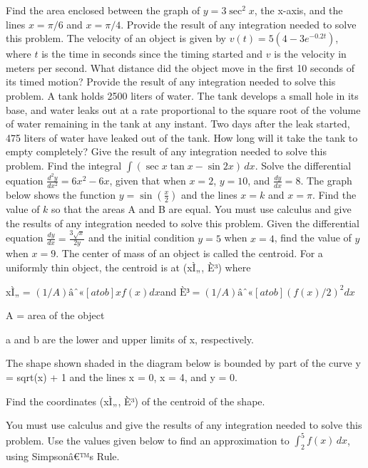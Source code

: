 \documentclass[12pt,addpoints]{exam}
\begin{document}
\begin{questions}
\fillwithlines{3cm}
\question[5] Find the area enclosed between the graph of \(y = 3 \sec^2 x\), the x-axis, and the lines \(x = \pi/6\) and \(x = \pi/4\). Provide the result of any integration needed to solve this problem.
\fillwithlines{3cm}
\question[5] The velocity of an object is given by \(v(t) = 5(4 - 3e^{-0.2t})\), where \(t\) is the time in seconds since the timing started and \(v\) is the velocity in meters per second. What distance did the object move in the first 10 seconds of its timed motion? Provide the result of any integration needed to solve this problem.
\fillwithlines{3cm}
\question[5] A tank holds 2500 liters of water. The tank develops a small hole in its base, and water leaks out at a rate proportional to the square root of the volume of water remaining in the tank at any instant. Two days after the leak started, 475 liters of water have leaked out of the tank. How long will it take the tank to empty completely? Give the result of any integration needed to solve this problem.
\fillwithlines{3cm}
\question[5] Find the integral \(\int (\sec x \tan x - \sin 2x) \, dx\).
\fillwithlines{3cm}
\question[5] Solve the differential equation \(\frac{d^2 y}{dx^2} = 6x^2 - 6x\), given that when \(x = 2\), \(y = 10\), and \(\frac{dy}{dx} = 8\).
\fillwithlines{3cm}
\question[5] The graph below shows the function \( y = \sin \left( \frac{x}{2} \right) \) and the lines \( x = k \) and \( x = \pi \). Find the value of \( k \) so that the areas A and B are equal. You must use calculus and give the results of any integration needed to solve this problem.
\fillwithlines{3cm}
\question[5] Given the differential equation \(\frac{dy}{dx} = \frac{3\sqrt{x}}{2y}\) and the initial condition \(y = 5\) when \(x = 4\), find the value of \(y\) when \(x = 9\).
\fillwithlines{3cm}
\question[5] The center of mass of an object is called the centroid. For a uniformly thin object, the centroid is at (xÌ„, È³) where

xÌ„ = \((1/A) âˆ«[a to b] x f(x) dx \)and \(È³ = (1/A) âˆ«[a to b] (f(x)/2)^2 dx\)

A = area of the object

a and b are the lower and upper limits of x, respectively.

The shape shown shaded in the diagram below is bounded by part of the curve y = sqrt(x) + 1 and the lines x = 0, x = 4, and y = 0.

Find the coordinates (xÌ„, È³) of the centroid of the shape.

You must use calculus and give the results of any integration needed to solve this problem.
\fillwithlines{3cm}
\question[5] Use the values given below to find an approximation to \(\int_{2}^{5} f(x) \, dx\), using Simpsonâ€™s Rule.


\end{questions}
\end{document}
